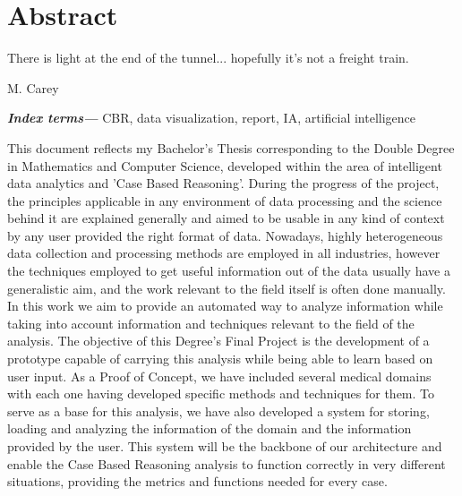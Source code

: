 %
%
%
%
%

\chapter{Abstract}

\begin{FraseCelebre}
\begin{Frase}
There is light at the end of the tunnel... hopefully it's not a freight train.
\end{Frase}
\begin{Fuente}
M. Carey
\end{Fuente}
\end{FraseCelebre}
\providecommand{\keywords}[1]{\textbf{\textit{Index terms---}} #1}
\keywords{CBR, data visualization, report, IA, artificial intelligence}

\bigskip
This document reflects my Bachelor's Thesis corresponding to the Double Degree in Mathematics and Computer Science, developed within the area of intelligent data analytics and 'Case Based Reasoning'. 
During the progress of the project, the principles applicable in any environment of data processing and the science behind it are explained generally and aimed to be usable in any kind of context by any user provided the right format of data.
Nowadays, highly heterogeneous data collection and processing methods are employed in all industries, 
however the techniques employed to get useful information out of the data usually have a generalistic aim, 
and the work relevant to the field itself is often done manually. In this work we aim to provide an automated way to analyze information while taking into account information and techniques relevant to the field of the analysis.
The objective of this Degree's Final Project is the development of a prototype capable of carrying this analysis while being able to learn based on user input. As a Proof of Concept, we have included several medical domains with each one having developed specific methods and techniques for them.
To serve as a base for this analysis, we have also developed a system for storing, loading and analyzing the information of the domain and the information provided by the user. This system will be the backbone of our architecture and enable the Case Based Reasoning analysis to function correctly in very different situations, providing the metrics and functions needed for every case.

